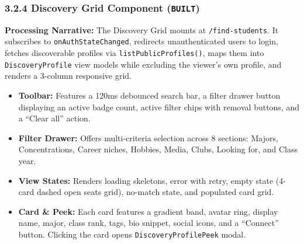 \documentclass[11pt,letterpaper]{article}
\begin{document}
\subsubsection*{3.2.4 Discovery Grid Component (\texttt{BUILT})}
\textbf{Processing Narrative:} The Discovery Grid mounts at \texttt{/find-students}. It subscribes to \texttt{onAuthState}\allowbreak\texttt{Changed}, redirects unauthenticated users to login, fetches discoverable profiles via \texttt{listPublicProfiles()}, maps them into \texttt{DiscoveryProfile} view models while excluding the viewer's own profile, and renders a 3-column responsive grid.
\begin{itemize}[leftmargin=*,noitemsep]
\item \textbf{Toolbar:} Features a 120ms debounced search bar, a filter drawer button displaying an active badge count, active filter chips with removal buttons, and a ``Clear all'' action.
\item \textbf{Filter Drawer:} Offers multi-criteria selection across 8 sections: Majors, Concentrations, Career niches, Hobbies, Media, Clubs, Looking for, and Class year.
\item \textbf{View States:} Renders loading skeletons, error with retry, empty state (4-card dashed open seats grid), no-match state, and populated card grid.
\item \textbf{Card \& Peek:} Each card features a gradient band, avatar ring, display name, major, class rank, tags, bio snippet, social icons, and a ``Connect'' button. Clicking the card opens \texttt{DiscoveryProfilePeek} modal.
\end{itemize}
\end{document}
